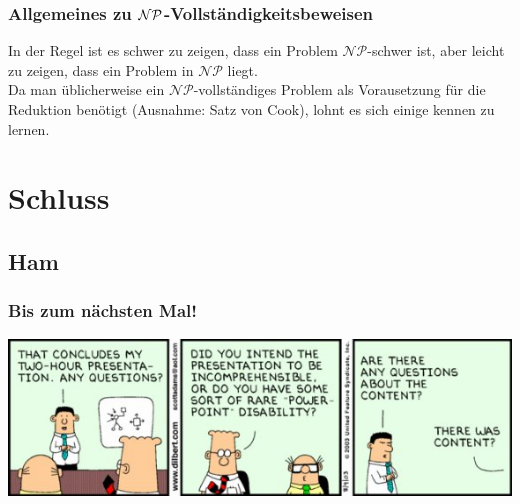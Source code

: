 \begin{frame}
\frametitle{Allgemeines zu $\mathcal{NP}$-Vollständigkeitsbeweisen}
In der Regel ist es schwer zu zeigen, dass ein Problem $\mathcal{NP}$-schwer ist, aber leicht zu zeigen, dass ein Problem in $\mathcal{NP}$ liegt.\\[8pt]
Da man üblicherweise ein $\mathcal{NP}$-vollständiges Problem als Vorausetzung für die Reduktion benötigt (Ausnahme: Satz von Cook), lohnt es sich einige kennen zu lernen.
\end{frame}

\section{Schluss}
\subsection{Ham}

\begin{frame}
	\frametitle{Bis zum nächsten Mal!}
	
	\begin{center}
		\includegraphics[width=\textwidth]{images/221_strip.jpg}
	\end{center}
\end{frame}



